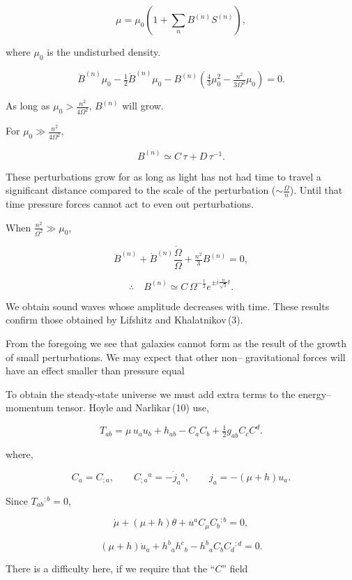 \[
\mu = \mu_{0}\left(1 + \sum_{n} B^{(n)} S^{(n)}\right),
\]

where $\mu_{0}$ is the undisturbed density.

\[
\ddot{B}^{(n)}\mu_{0} - \tfrac{1}{2}\dot{B}^{(n)}\mu_{0} - B^{(n)}\left(\tfrac{4}{3}\mu_{0}^{2} - \tfrac{n^{2}}{3\Omega^{2}}\mu_{0}\right) = 0.
\]

As long as $\mu_{0} > \tfrac{n^{2}}{4\Omega^{2}}$, $B^{(n)}$ will grow.  

For $\mu_{0} \gg \tfrac{n^{2}}{4\Omega^{2}}$,

\[
B^{(n)} \simeq C\,\tau + D\,\tau^{-1}.
\]

These perturbations grow for as long as light has not had time to 
travel a significant distance compared to the scale of the perturbation 
($\sim \tfrac{\Omega}{n}$). Until that time pressure forces cannot act to even out 
perturbations.

When $\tfrac{n^{2}}{\Omega^{2}} \gg \mu_{0}$,

\[
\ddot{B}^{(n)} + \dot{B}^{(n)}\frac{\dot{\Omega}}{\Omega} + \tfrac{n^{2}}{3}B^{(n)} = 0,
\]

\[
\therefore \quad B^{(n)} \simeq C\,\Omega^{-\tfrac{1}{2}} e^{\pm i \tfrac{n}{\sqrt{3}} t}.
\]

We obtain sound waves whose amplitude decreases with time.  
These results confirm those obtained by Lifshitz and Khalatnikov\,(3).

From the foregoing we see that galaxies cannot form as the result 
of the growth of small perturbations. We may expect that other non–
gravitational forces will have an effect smaller than pressure equal 

To obtain the steady-state universe we must add extra terms to 
the energy–momentum tensor. Hoyle and Narlikar\,(10) use,

\[
T_{ab} = \mu\, u_{a} u_{b} + h_{ab} - C_{a} C_{b} 
+ \tfrac{1}{2} g_{ab} C_{c} C^{d}. \tag{20}
\]

where,  

\[
C_{a} = C_{;a}, \qquad 
C_{;a}{}^{a} = -\dot{j}_{a}{}^{a}, \qquad 
j_{a} = -(\mu + h) u_{a}.
\]

Since $T_{ab}{}^{;b} = 0$,

\[
\dot{\mu} + (\mu + h)\theta + u^{a} C_{\mu} C_{b}{}^{;b} = 0, \tag{21}
\]

\[
(\mu + h)\dot{u}_{a} + h^{b}{}_{a} h^{c}{}_{b} 
- h^{b}{}_{a} C_{b} C_{d}{}^{;d} = 0. \tag{22}
\]

There is a difficulty here, if we require that the ``$C$'' field


